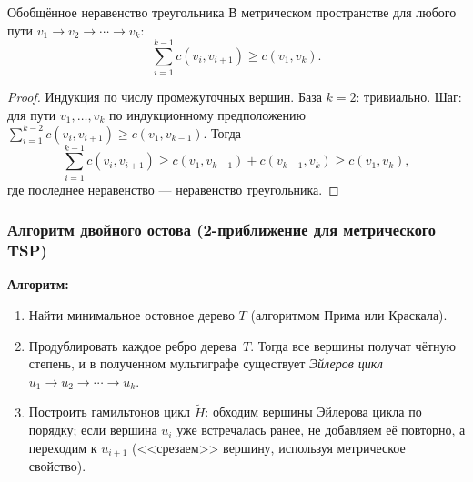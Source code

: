 \begin{Statement}{Обобщённое неравенство треугольника}{}
	В метрическом пространстве для любого пути $v_1 \to v_2 \to \cdots \to v_k$:
	\[
	\sum_{i=1}^{k-1} c(v_i, v_{i+1}) \geq c(v_1, v_k).
	\]
\end{Statement}

\begin{proof}
	Индукция по числу промежуточных вершин. База $k=2$: тривиально. Шаг: для пути $v_1,\ldots,v_k$ по индукционному предположению $\sum_{i=1}^{k-2}c(v_i,v_{i+1}) \geq c(v_1,v_{k-1})$. Тогда
\[
\sum_{i=1}^{k-1} c(v_i,v_{i+1}) \geq c(v_1,v_{k-1}) + c(v_{k-1},v_k) \geq c(v_1,v_k),
\]
где последнее неравенство — неравенство треугольника.
\end{proof}

\begin{center}
\end{center}

\subsubsection*{Алгоритм двойного остова (2-приближение для метрического TSP)}

\textbf{Алгоритм:}
\begin{enumerate}
	\item Найти минимальное остовное дерево $T$ (алгоритмом Прима или Краскала).
	\item Продублировать каждое ребро дерева~$T$. Тогда все вершины получат чётную степень, и в полученном мультиграфе существует \emph{Эйлеров цикл} $u_1 \to u_2 \to \cdots \to u_k$.
	\item Построить гамильтонов цикл $\widetilde{H}$: обходим вершины Эйлерова цикла по порядку; если вершина $u_i$ уже встречалась ранее, не добавляем её повторно, а переходим к $u_{i+1}$ (<<срезаем>> вершину, используя метрическое свойство).
\end{enumerate}

